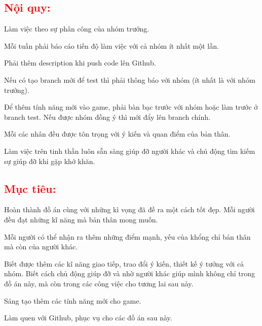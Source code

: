 \documentclass{article}
\begin{document}
\textcolor{red}{\section{\Large{Nội quy:}}}
\begin{enumerate}
    \large{
    \item Làm việc theo sự phân công của nhóm trưởng.
    \item Mỗi tuần phải báo cáo tiến độ làm việc với cả nhóm ít nhất một lần.
    \item Phải thêm description khi push code lên Github.
    \item Nếu có tạo branch mới để test thì phải thông báo với nhóm (ít nhất là với nhóm trưởng). 
    \item Để thêm tính năng mới vào game, phải bàn bạc trước với nhóm hoặc làm trước ở branch test. Nếu được nhóm đồng ý thì mới đẩy lên branch chính.
    \item Mỗi các nhân đều được tôn trọng với ý kiến và quan điểm của bản thân.
    \item Làm việc trên tinh thần luôn sẵn sàng giúp đỡ người khác và chủ động tìm kiếm sự giúp đỡ khi gặp khớ khăn.
    }
\end{enumerate}

\textcolor{red}{\section{\Large{Mục tiêu:}}}
\begin{enumerate}
    \large{
    \item Hoàn thành đồ án cùng với những kì vọng đã đề ra một cách tốt đẹp. Mỗi người đều đạt những kĩ năng mà bản thân mong muốn.
    \item Mỗi người có thể nhận ra thêm những điểm mạnh, yếu của khổng chỉ bản thân mà còn của người khác.
    \item Biết được thêm các kĩ năng giao tiếp, trao đổi ý kiến, thiết kế ý tưởng với cả nhóm. Biết cách chủ động giúp đỡ và nhờ người khác giúp mình không chỉ trong đồ án này, mà còn trong các công việc cho tương lai sau này.  
    \item Sáng tạo thêm các tính năng mới cho game.
    \item Làm quen với Github, phục vụ cho các đồ án sau này.

    }
    
\end{enumerate}
\end{document}
